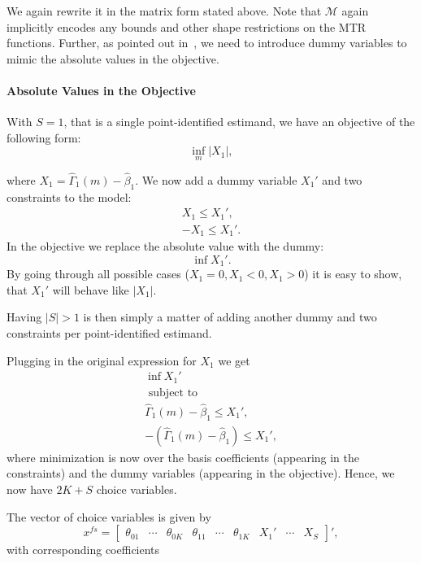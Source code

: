 \documentclass[12pt,a4paper,english]{article} %
\numberwithin{equation}{section}
\numberwithin{figure}{section}
\numberwithin{table}{section}
\begin{document}
We again rewrite it in the matrix form stated above.
Note that $\mathcal{M}$ again implicitly encodes any bounds and other shape restrictions on the MTR functions.
Further, as pointed out in~\cite{mogstad2018using}, we need to introduce dummy variables to mimic the absolute values in the objective.

\paragraph{Absolute Values in the Objective}
With $S = 1$, that is a single point-identified estimand, we have an objective of the following form:
\begin{equation*}
  \inf_m |X_1|,
\end{equation*}

where $X_1 = \hat{\Gamma}_1(m) - \hat{\beta}_1$.
We now add a dummy variable $X_1'$ and two constraints to the model:
\begin{align*}
  X_1 \leq X_1', \\
  -X_1 \leq X_1'.
\end{align*}
In the objective we replace the absolute value with the dummy:
\begin{equation*}
  \inf X_1'.
\end{equation*}
By going through all possible cases ($X_1=0, X_1<0, X_1>0$) it is easy to show,
that $X_1'$ will behave like $|X_1|$.

Having $|S|>1$ is then simply a matter of adding another dummy and two constraints per point-identified estimand.

Plugging in the original expression for $X_1$ we get
\begin{align*}
  \inf X_1' \\
  \text{ subject to }\\
  \hat{\Gamma}_1(m) - \hat{\beta}_1 \leq X_1', \\
  -(\hat{\Gamma}_1(m) - \hat{\beta}_1) \leq X_1',
\end{align*}
where minimization is now over the basis coefficients (appearing in the constraints) and the dummy variables (appearing in the objective).
Hence, we now have $2K + S$ choice variables.

The vector of choice variables is given by
\begin{equation*}
  x^{fs} =
  \begin{bmatrix}
     \theta_{01} & \cdots & \theta_{0K} & \theta_{11} & \cdots & \theta_{1K} & X_1' & \cdots & X_{S}
  \end{bmatrix}',
\end{equation*}
with corresponding coefficients
\end{document}
